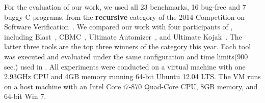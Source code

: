 For the evaluation of our work, we used all 23 benchmarks, 16 bug-free and 7 buggy C programs, from the \textbf{recursive} category of the 2014 Competition on Software Verification~\cite{svcomp14}.
We compared our work with four participants of \cite{svcomp14}, including Blast~\cite{BeyerHJM07}, CBMC~\cite{}, Ultimate Automizer~\cite{HeizmannCDEHLNSP13}, and Ultimate Kojak~\cite{Kojak}. The latter three tools are the top three winners of the category this year.
Each tool was executed and evaluated under the same configuration and time limits(900 sec.) used in \cite{svcomp14}.
All experiments were conducted on a virtual machine with one 2.93GHz CPU and 4GB memory running 64-bit Ubuntu 12.04 LTS. The VM runs on a host machine with an Intel Core i7-870 Quad-Core CPU, 8GB memory, and 64-bit Win 7.
